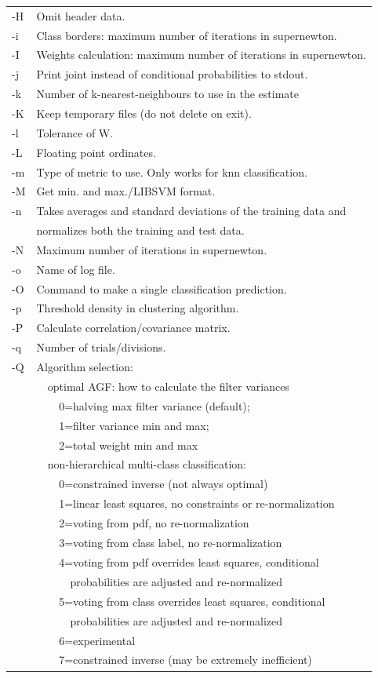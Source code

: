 \documentclass[12pt]{article}
\begin{document}
\begin{tabular}{ll}
-H & Omit header data.\\
-i & Class borders: maximum number of iterations in supernewton.\\
-I & Weights calculation: maximum number of iterations in supernewton.\\
-j & Print joint instead of conditional probabilities to stdout.\\
-k & Number of k-nearest-neighbours to use in the estimate\\
-K & Keep temporary files (do not delete on exit).\\
-l & Tolerance of W.\\
-L & Floating point ordinates.\\
-m & Type of metric to use.  Only works for knn classification.\\
-M & Get min. and max./LIBSVM format.\\
-n & Takes averages and standard deviations of the training data and \\
 & normalizes both the training and test data.\\
-N & Maximum number of iterations in supernewton.\\
-o & Name of log file.\\
-O & Command to make a single classification prediction.\\
-p & Threshold density in clustering algorithm.\\
-P & Calculate correlation/covariance matrix.\\
-q & Number of trials/divisions.\\
-Q & Algorithm selection:\\
  & \verb/  /optimal AGF: how to calculate the filter variances\\
  & \verb/    /0=halving max filter variance (default);\\
  & \verb/    /1=filter variance min and max;\\
  & \verb/    /2=total weight min and max\\
  & \verb/  /non-hierarchical multi-class classification:\\
  & \verb/    /0=constrained inverse (not always optimal)\\
  & \verb/    /1=linear least squares, no constraints or re-normalization\\
  & \verb/    /2=voting from pdf, no re-normalization\\
  & \verb/    /3=voting from class label, no re-normalization\\
  & \verb/    /4=voting from pdf overrides least squares, conditional\\
  & \verb/      /probabilities are adjusted and re-normalized\\
  & \verb/    /5=voting from class overrides least squares, conditional\\
  & \verb/      /probabilities are adjusted and re-normalized\\
  & \verb/    /6=experimental\\
  & \verb/    /7=constrained inverse (may be extremely inefficient)
\end{tabular}
\end{document}
